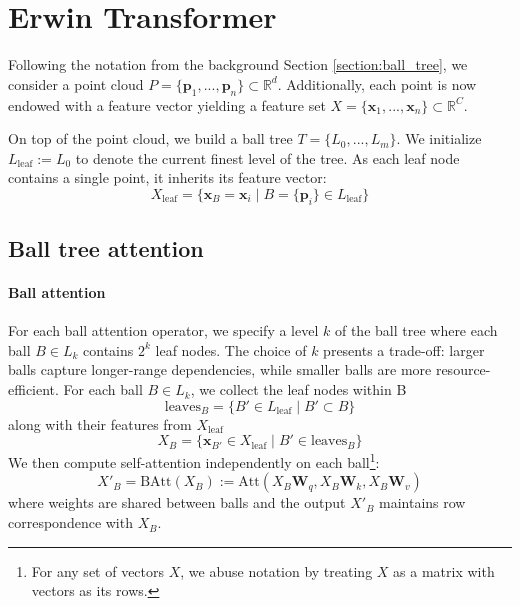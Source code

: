 \section{Erwin Transformer}
\label{section:erwin}

Following the notation from the background Section \ref{section:ball_tree}, we consider a point cloud $P = \{ \mathbf{p}_1, ..., \mathbf{p}_n\} \subset \mathbb{R}^d$. Additionally, each point is now endowed with a feature vector yielding a feature set $X = \{ \mathbf{x}_1, ..., \mathbf{x}_n \} \subset \mathbb{R}^C$.

On top of the point cloud, we build a ball tree $T = \{ L_0, ..., L_m\}$. We initialize $L_\mathrm{leaf} := L_0$ to denote the current finest level of the tree. As each leaf node contains a single point, it inherits its feature vector:
\begin{equation}
    X_{\mathrm{leaf}} = \{ \mathbf{x}_B = \mathbf{x}_i \mid B = \{\mathbf{p}_i\} \in L_\mathrm{leaf} \}
\end{equation}

\subsection{Ball tree attention} \label{sec:ball-tree-attn}
\paragraph{Ball attention}
For each ball attention operator, we specify a level $k$ of the ball tree where each ball $B \in L_k$ contains $2^k$ leaf nodes. The choice of $k$ presents a trade-off: larger balls capture longer-range dependencies, while smaller balls are more resource-efficient. For each ball $B \in L_k$, we collect the leaf nodes within B
\begin{equation}
\mathrm{leaves}_B = \{ B' \in L_\mathrm{leaf} \mid B' \subset B \}
\end{equation}
along with their features from $X_\mathrm{leaf}$
\begin{equation}
    X_B = \{ \mathbf{x}_{B'} \in X_\mathrm{leaf} \mid B' \in \mathrm{leaves}_B \}
\end{equation}
We then compute self-attention independently on each ball\footnote{For any set of vectors $X$, we abuse notation by treating $X$ as a matrix with vectors as its rows.}:
\begin{equation}
\label{eq:ball_attention}
    X'_B = \mathrm{BAtt}(X_B):= \mathrm{Att}(X_B \mathbf{W}_q, X_B \mathbf{W}_k, X_B \mathbf{W}_v)
\end{equation}
where weights are shared between balls and the output $X'_B$ maintains row correspondence with $X_B$. 


